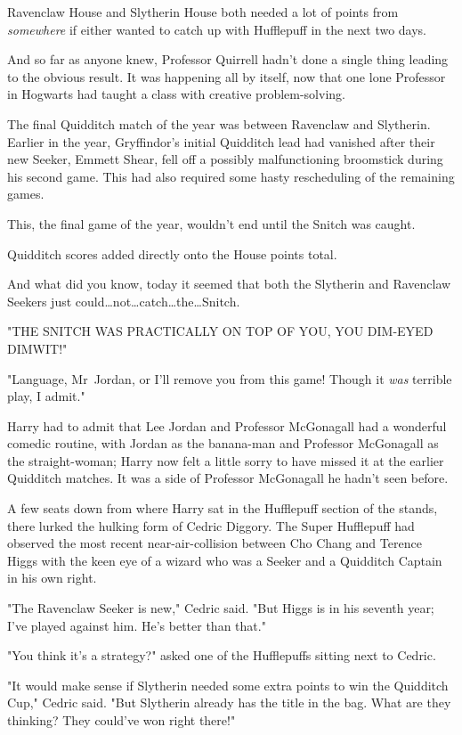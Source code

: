 Ravenclaw House and Slytherin House both needed a lot of points from
\emph{somewhere} if either wanted to catch up with Hufflepuff in the next two
days.

And so far as anyone knew, Professor Quirrell hadn't done a single thing
leading to the obvious result. It was happening all by itself, now that one
lone Professor in Hogwarts had taught a class with creative problem-solving.

The final Quidditch match of the year was between Ravenclaw and Slytherin.
Earlier in the year, Gryffindor's initial Quidditch lead had vanished after
their new Seeker, Emmett Shear, fell off a possibly malfunctioning broomstick
during his second game. This had also required some hasty rescheduling of the
remaining games.

This, the final game of the year, wouldn't end until the Snitch was caught.

Quidditch scores added directly onto the House points total.

And what did you know, today it seemed that both the Slytherin and Ravenclaw
Seekers just could…not…catch…the…Snitch.

"THE SNITCH WAS PRACTICALLY ON TOP OF YOU, YOU DIM-EYED DIMWIT!"

"Language, Mr~Jordan, or I'll remove you from this game! Though it \emph{was}
terrible play, I admit."

Harry had to admit that Lee Jordan and Professor McGonagall had a wonderful
comedic routine, with Jordan as the banana-man and Professor McGonagall as the
straight-woman; Harry now felt a little sorry to have missed it at the earlier
Quidditch matches. It was a side of Professor McGonagall he hadn't seen before.

A few seats down from where Harry sat in the Hufflepuff section of the
stands, there lurked the hulking form of Cedric Diggory. The Super
Hufflepuff had observed the most recent near-air-collision between Cho Chang
and Terence Higgs with the keen eye of a wizard who was a Seeker and a
Quidditch Captain in his own right.

"The Ravenclaw Seeker is new," Cedric said. "But Higgs is in his seventh year;
I've played against him. He's better than that."

"You think it's a strategy?" asked one of the Hufflepuffs sitting next to
Cedric.

"It would make sense if Slytherin needed some extra points to win the
Quidditch Cup," Cedric said. "But Slytherin already has the title in the bag.
What are they thinking? They could've won right there!"

